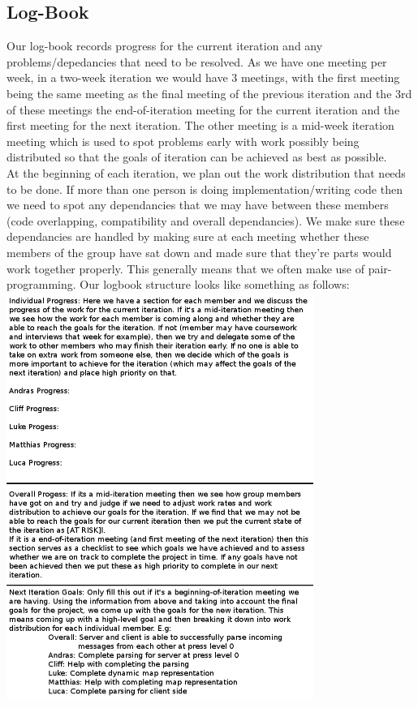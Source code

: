 \documentclass[12pt]{article}
\begin{document}
\subsection{Log-Book}
Our log-book records progress for the current iteration and any problems/depedancies that need to be resolved. As we have one meeting per week, in a two-week iteration we would have 3 meetings, with the first meeting being the same meeting as the final meeting of the previous iteration and the 3rd of these meetings the end-of-iteration meeting for the current iteration and the first meeting for the next iteration. The other meeting is a mid-week iteration meeting which is used to spot problems early with work possibly being distributed so that the goals of iteration can be achieved as best as possible. 
\\
At the beginning of each iteration, we plan out the work distribution that needs to be done. If more than one person is doing implementation/writing code then we need to spot any dependancies that we may have between these members (code overlapping, compatibility and overall dependancies). We make sure these dependancies are handled by making sure at each meeting whether these members of the group have sat down and made sure that they're parts would work together properly. This generally means that we often make use of pair-programming. Our logbook structure looks like something as follows:
\\ 
\includegraphics[width=100mm]{logbooktemplate.png}
\end{document}
